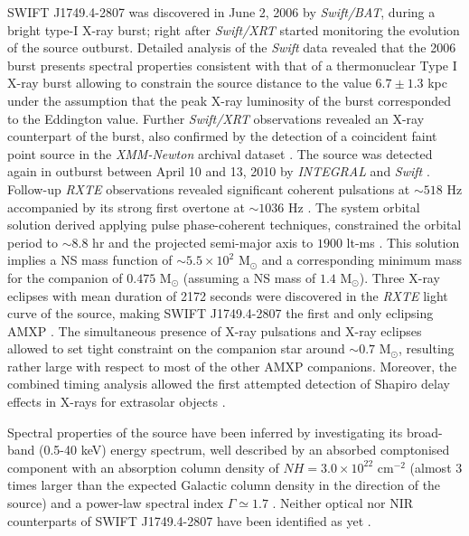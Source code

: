 \documentclass[graybox]{svmult}
\def \inte {{\em INTEGRAL\xspace}}
\def \swift {{\em Swift\xspace}}
\def \xmm {{\em XMM-Newton\xspace}}
\def \rxte {{\em RXTE\xspace}}
\def \swiftxrt{{\em Swift/XRT\xspace}}
\def \swiftbat{{\em Swift/BAT\xspace}}
\begin{document}
SWIFT J1749.4-2807 was discovered in June 2, 2006 \cite{Schady2006} by \swiftbat{}, during a bright type-I X-ray burst; right after \swiftxrt{} started monitoring the evolution of the source outburst. Detailed analysis of the \swift{} data \cite{Wijnands2009} revealed that the 2006 burst presents spectral properties consistent with that of a thermonuclear Type I X-ray burst allowing to constrain the source distance to the value $6.7\pm 1.3$ kpc under the assumption that the peak X-ray luminosity of the burst corresponded to the Eddington value. Further \swiftxrt{} observations revealed an X-ray counterpart of the burst, also confirmed by the detection of a coincident faint point source in the \xmm{} archival dataset \cite{Wijnands2009}. 
The source was detected again in outburst between April 10 and 13, 2010 by \inte{} and \swift{} \cite{Pavan2010,Chenevez2010}. Follow-up \rxte{} observations revealed significant coherent pulsations at $\sim518$ Hz accompanied by its strong first overtone at $\sim1036$ Hz \cite{Altamirano2010d,Bozzo2010b}. The system orbital solution derived applying pulse phase-coherent techniques, constrained the orbital period to $\sim8.8$ hr and the projected semi-major axis to $1900$ lt-ms \cite{Strohmayer2010}. This solution implies a NS mass function of $\sim5.5\times 10^2$ M$_\odot$ and a corresponding minimum mass for the companion of $0.475$ M$_\odot$ (assuming a NS mass of $1.4$ M$_\odot$). Three X-ray eclipses with mean duration of 2172 seconds were discovered in the \rxte{} light curve of the source, making SWIFT J1749.4-2807 the first and only eclipsing AMXP \cite{Markwardt2010c}. The simultaneous presence of X-ray pulsations and X-ray eclipses allowed to set tight constraint on the companion star around $\sim0.7$ M$_\odot$, resulting rather large with respect to most of the other AMXP companions. Moreover, the combined timing analysis allowed the first attempted detection of Shapiro delay effects in X-rays for extrasolar objects \cite{Markwardt2010b}.

Spectral properties of the source have been inferred by investigating its broad-band (0.5-40 keV) energy spectrum, well described by an absorbed comptonised component with an absorption column density of $NH = 3.0\times 10^{22}$ cm$^{-2}$ (almost 3 times larger than the expected Galactic column density in the direction of the source) and a power-law spectral index $\Gamma\simeq1.7$ \cite{Ferrigno2011}. 
Neither optical nor NIR counterparts of SWIFT J1749.4-2807 have been identified as yet \cite{Yang2010,DAvanzo2011}.
\end{document}
